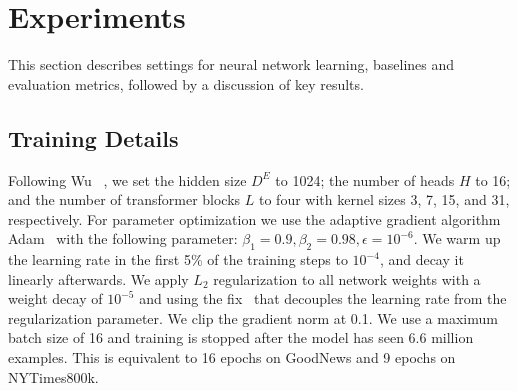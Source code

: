 

\secmoveup
\section{Experiments}
This section describes settings for neural network learning, baselines and
evaluation metrics, followed by a discussion of key results.


\secmoveup
\subsection{Training Details}
\label{ssec:training_details}



Following Wu \etal~\cite{Wu2018PayLA}, we set the hidden size $D^E$ to 1024;
the number of heads $H$ to 16; and the number of transformer blocks $L$ to four
with kernel sizes 3, 7, 15, and 31, respectively. For parameter optimization we
use the adaptive gradient algorithm Adam~\cite{Kingma2015Adam} with the
following parameter: $\beta_1 = 0.9, \beta_2 = 0.98, \epsilon = 10^{-6}$. We
warm up the learning rate in the first 5\% of the training steps to $10^{-4}$,
and decay it linearly afterwards. We apply $L_2$ regularization to all network
weights with a weight decay of $10^{-5}$ and using the
fix~\cite{Loshchilov2018DecoupledWD} that decouples the learning rate from the
regularization parameter. We clip the gradient norm at 0.1. We use a maximum
batch size of 16 and training is stopped after the model has seen 6.6 million
examples. This is equivalent to 16 epochs on GoodNews and 9 epochs on
NYTimes800k.



